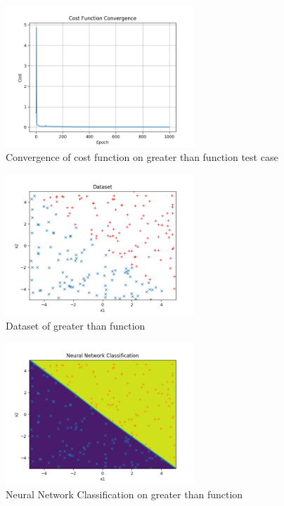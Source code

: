 \documentclass[journal]{IEEEtran}
\begin{document}
\begin{figure}
  \begin{center}
  \includegraphics[width=2.8in]{./../code/result_greater_than/cost_function_convergence.png}
  \caption{Convergence of cost function on greater than function test case}
  \label{img:greater_cost}
  \end{center}
\end{figure}

\begin{figure}
  \begin{center}
  \includegraphics[width=2.8in]{./../code/result_greater_than/dataset.png}
  \caption{Dataset of greater than function}
  \label{img:greater_data_set}
  \end{center}
\end{figure}

\begin{figure}
  \begin{center}
  \includegraphics[width=2.8in]{./../code/result_greater_than/neural_net_classification.png}
  \caption{Neural Network Classification on greater than function}
  \label{img:greater_classification}
  \end{center}
\end{figure}
\end{document}
